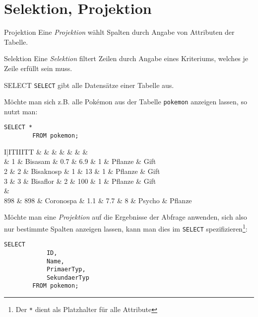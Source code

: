 \section{Selektion, Projektion}

\begin{defi}{Projektion}
    Eine \emph{Projektion} wählt Spalten durch Angabe von Attributen der Tabelle.
\end{defi}

\begin{defi}{Selektion}
    Eine \emph{Selektion} filtert Zeilen durch Angabe eines Kriteriums, welches je Zeile erfüllt sein muss.
\end{defi}

\begin{sql}{SELECT}
    \texttt{SELECT} gibt alle Datensätze einer Tabelle aus.

    Möchte man sich z.B. alle Pokémon aus der Tabelle \texttt{pokemon} anzeigen lassen, so nutzt man:

    \begin{lstlisting}[language=mysql]
        SELECT *
        FROM pokemon;
    \end{lstlisting}

    \setcounter{rownum}{0}
    \begin{tabular}{I|ITIIITT}
        &  &  &  &  &  &  &  \\ & 1 & Bisasam & 0.7 & 6.9 & 1 & Pflanze & Gift \\
        2 & 2 & Bisaknosp & 1 & 13 & 1 & Pflanze & Gift \\
        3 & 3 & Bisaflor & 2 & 100 & 1 & Pflanze & Gift \\
         &  \\
        898 & 898 & Coronospa & 1.1 & 7.7 & 8 & Psycho & Pflanze \\
    \end{tabular}

    Möchte man eine \emph{Projektion} auf die Ergebnisse der Abfrage anwenden, sich also nur bestimmte Spalten anzeigen lassen, kann man dies im \texttt{SELECT} spezifizieren\footnote{Der \texttt{*} dient als Platzhalter für alle Attribute}:

    \begin{lstlisting}[language=mysql]
        SELECT
            ID,
            Name,
            PrimaerTyp,
            SekundaerTyp
        FROM pokemon;
    \end{lstlisting}


\end{sql}
